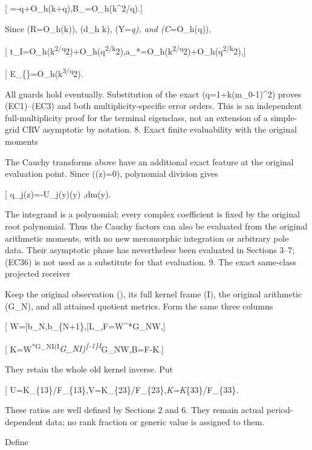 {[} \log\eta=-q+O\_h(k+\log q),\qquad B\_\chi=O\_h(k\^{}2/q).{]}

Since (R=O\_h(k)), (d\asymp\_h k), (Y=\epsilon\emph{q), and (C}=O\_h(q)),

{[} t\_I=O\_h(k\textsuperscript{2/q}2)+O\_h(\eta q\textsuperscript{2/k}2),\qquad a\_*=O\_h(k\textsuperscript{2/q}2)+O\_h(\eta q\textsuperscript{2/k}2),{]}

{[} E\_\{\}=O\_h(k\textsuperscript{3/q}2). \tag{EC35}{]}

All guards hold eventually. Substitution of the exact (q=1+k(m\_0-1)\^{}2) proves (EC1)--(EC3) and both multiplicity-specific error orders. This is an independent full-multiplicity proof for the terminal eigenclass, not an extension of a simple-grid CRV asymptotic by notation. 8. Exact finite evaluability with the original moments

The Cauchy transforms above have an additional exact feature at the original evaluation point. Since (\widehat\chi(z)=0), polynomial division gives

{[} q\_j(z)=-\int U\_j(y)\widehat\chi(y) ,dm(y). \tag{EC36}{]}

The integrand is a polynomial; every complex coefficient is fixed by the original root polynomial. Thus the Cauchy factors can also be evaluated from the original arithmetic moments, with no new meromorphic integration or arbitrary pole data. Their asymptotic phase has nevertheless been evaluated in Sections 3--7; (EC36) is not used as a substitute for that evaluation. 9. The exact same-class projected receiver

Keep the original observation (\Lambda), its full kernel frame (I), the original arithmetic (G\_N), and all attained quotient metrics. Form the same three columns

{[} W={[}b\_N,b\_\{N+1\},{[}L\_\lambda{]}{]},\quad F=W\^{}*G\_NW,{]}

{[} K=W\textsuperscript{*G\_NI(I}\emph{G\_NI)\textsuperscript{\{-1\}I}}G\_NW,\qquad B=F-K.{]}

They retain the whole old kernel inverse. Put

{[} U=K\_\{13\}/F\_\{13\},\qquad V=K\_\{23\}/F\_\{23\},\qquad \theta\emph{K=K}\{33\}/F\_\{33\}. \tag{EC37}{]}

These ratios are well defined by Sections 2 and 6. They remain actual period-dependent data; no rank fraction or generic value is assigned to them.

Define

